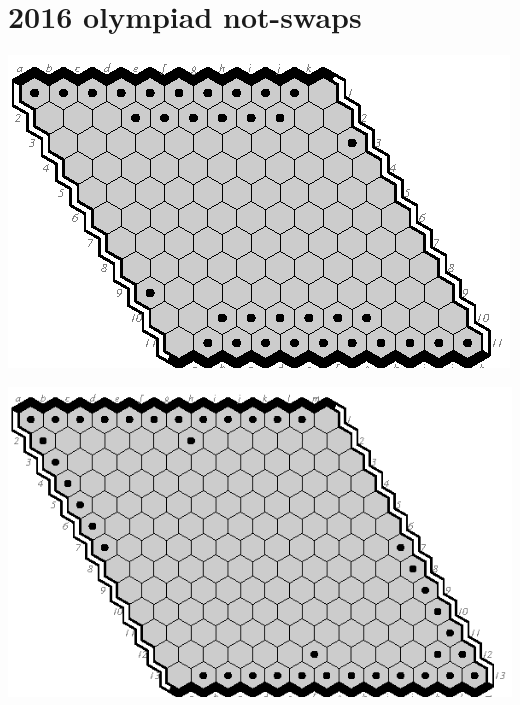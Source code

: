 \documentclass{article}
\begin{document}
\section*{2016 olympiad not-swaps}

\vfill\vfill\vfill

\includegraphics[scale=2]{data/pix/swaps11.eps}\vfill\vfill

\includegraphics[scale=2]{data/pix/swaps13.eps}\vfill\vfill\vfill~
\newpage
\end{document}
